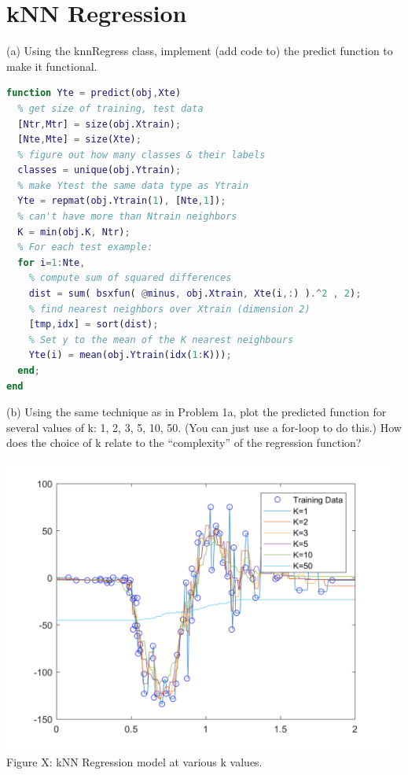 \documentclass[]{report}   %
\begin{document}
\section{kNN Regression}
(a) Using the knnRegress class, implement (add code to) the predict function to make it functional.
\begin{lstlisting}[language=Matlab, caption=predict() Implementation]
% Test function: predict on Xtest
function Yte = predict(obj,Xte)
  % get size of training, test data
  [Ntr,Mtr] = size(obj.Xtrain);
  [Nte,Mte] = size(Xte);
  % figure out how many classes & their labels
  classes = unique(obj.Ytrain);        
  % make Ytest the same data type as Ytrain  
  Yte = repmat(obj.Ytrain(1), [Nte,1]);  
  % can't have more than Ntrain neighbors
  K = min(obj.K, Ntr);                  
  % For each test example:
  for i=1:Nte,                
    % compute sum of squared differences          
    dist = sum( bsxfun( @minus, obj.Xtrain, Xte(i,:) ).^2 , 2);  
    % find nearest neighbors over Xtrain (dimension 2)
    [tmp,idx] = sort(dist);                                                
    % Set y to the mean of the K nearest neighbours
    Yte(i) = mean(obj.Ytrain(idx(1:K)));   
  end;
end
\end{lstlisting}

(b) Using the same technique as in Problem 1a, plot the predicted function for several values of k: 1, 2, 3, 5, 10, 50. (You can just use a for-loop to do this.) How does the choice of k relate to the “complexity” of the regression function?

\begin{center}
	\includegraphics[width=35em]{2_2_Figure_1.png}
	{Figure X: kNN Regression model at various k values.}
\end{center} 
\end{document}
